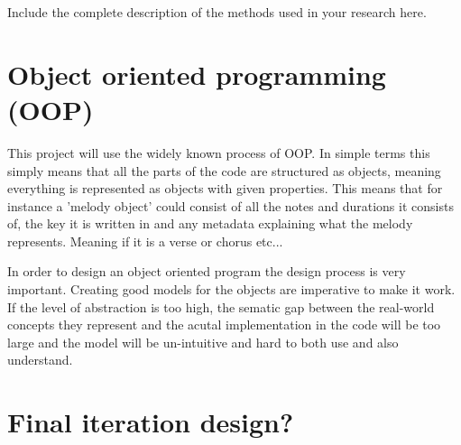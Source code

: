
Include the complete description of the methods used in your research here. \\


\section{Object oriented programming (OOP)}

This project will use the widely known process of \ac{OOP}. In simple terms this simply means that all the parts of the code are structured as objects, meaning everything is represented as objects with given properties. This means that for instance a 'melody object' could consist of all the notes and durations it consists of, the key it is written in and any metadata explaining what the melody represents. Meaning if it is a verse or chorus etc...

  In order to design an object oriented program the design process is very important. Creating good models for the objects are imperative to make it work. If the level of abstraction is too high, the sematic gap between the real-world concepts they represent and the acutal implementation in the code will be too large and the model will be un-intuitive and hard to both use and also understand.  

\section{Final iteration design?}
